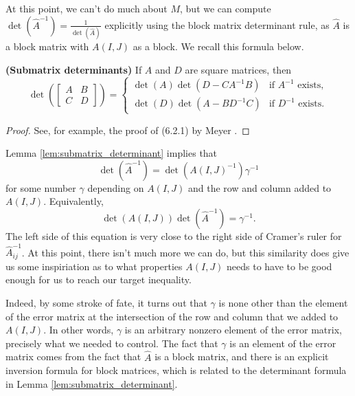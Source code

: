 \documentclass{article}
\begin{document}
	At this point, we can't do much about $M$, but we can compute $\det\left(\widehat{A}^{-1}\right) = \frac{1}{\det\left(\widehat{A}\right)}$ explicitly using the block matrix determinant rule, as $\widehat{A}$ is a block matrix with $A(I,J)$ as a block. We recall this formula below.
	
	\begin{lem} \textnormal{\bf(Submatrix determinants)}
		\label{lem:submatrix_determinant}
		If $A$ and $D$ are square matrices, then
		\begin{equation}
			\det\left(\left[\begin{matrix}A & B \\ C & D\end{matrix}\right]\right) = \begin{cases}
				\det(A)\det(D-CA^{-1}B) & \text{if $A^{-1}$ exists}, \\
				\det(D)\det(A-BD^{-1}C) & \text{if $D^{-1}$ exists}.
			\end{cases}
		\end{equation}
	\end{lem}
	
	\begin{proof}
		See, for example, the proof of (6.2.1) by Meyer \cite{meyer_2008}.
	\end{proof}
	
	Lemma \ref{lem:submatrix_determinant} implies that
	\begin{equation}
		\det\left(\widehat{A}^{-1}\right) = \det\left(A(I,J)^{-1}\right)\gamma^{-1}
	\end{equation}
	for some number $\gamma$ depending on $A(I,J)$ and the row and column added to $A(I,J)$. Equivalently,
	\begin{equation}
		\det(A(I,J))\det\left(\widehat{A}^{-1}\right) = \gamma^{-1}.
	\end{equation}
	The left side of this equation is very close to the right side of Cramer's ruler for $\widehat{A}^{-1}_{ij}$. At this point, there isn't much more we can do, but this similarity does give us some inspiriation as to what properties $A(I,J)$ needs to have to be good enough for us to reach our target inequality.
	
	Indeed, by some stroke of fate, it turns out that $\gamma$ is none other than the element of the error matrix at the intersection of the row and column that we added to $A(I,J)$. In other words, $\gamma$ is an arbitrary nonzero element of the error matrix, precisely what we needed to control. The fact that $\gamma$ is an element of the error matrix comes from the fact that $\widehat{A}$ is a block matrix, and there is an explicit inversion formula for block matrices, which is related to the determinant formula in Lemma \ref{lem:submatrix_determinant}.
	
\end{document}
